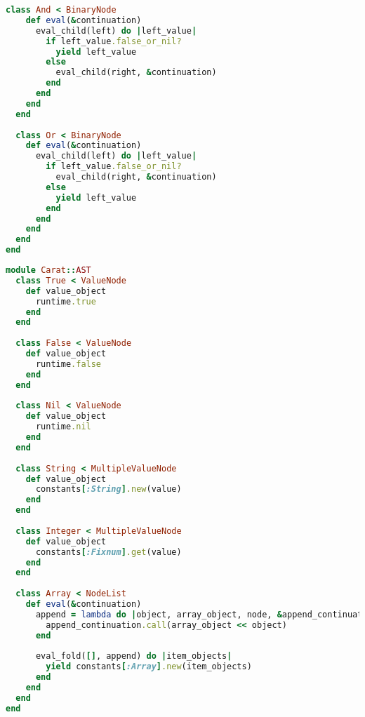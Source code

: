 \begin{lstlisting}[title={\small\Helvetica ast/control.rb},language=Ruby]
  class And < BinaryNode
    def eval(&continuation)
      eval_child(left) do |left_value|
        if left_value.false_or_nil?
          yield left_value
        else
          eval_child(right, &continuation)
        end
      end
    end
  end
  
  class Or < BinaryNode
    def eval(&continuation)
      eval_child(left) do |left_value|
        if left_value.false_or_nil?
          eval_child(right, &continuation)
        else
          yield left_value
        end
      end
    end
  end
end

\end{lstlisting}
\begin{lstlisting}[title={\small\Helvetica ast/literals.rb},language=Ruby]
module Carat::AST
  class True < ValueNode
    def value_object
      runtime.true
    end
  end
  
  class False < ValueNode
    def value_object
      runtime.false
    end
  end
  
  class Nil < ValueNode
    def value_object
      runtime.nil
    end
  end
  
  class String < MultipleValueNode
    def value_object
      constants[:String].new(value)
    end
  end
  
  class Integer < MultipleValueNode
    def value_object
      constants[:Fixnum].get(value)
    end
  end
  
  class Array < NodeList
    def eval(&continuation)
      append = lambda do |object, array_object, node, &append_continuation|
        append_continuation.call(array_object << object)
      end
      
      eval_fold([], append) do |item_objects|
        yield constants[:Array].new(item_objects)
      end
    end
  end
end

\end{lstlisting}
